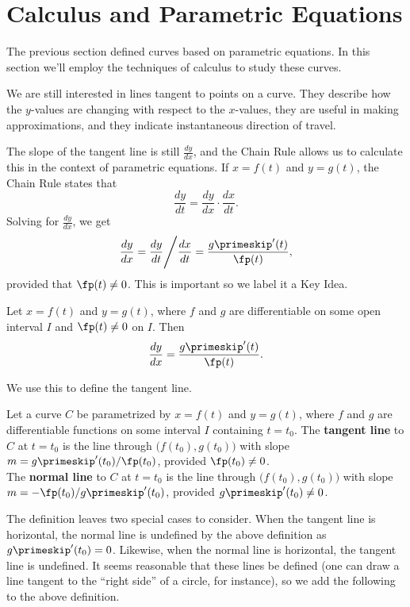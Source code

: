 \section{Calculus and Parametric Equations}\label{sec:par_calc}

The previous section defined curves based on parametric equations. In this section we'll employ the techniques of calculus to study these curves.

We are still interested in lines tangent to points on a curve. They describe how the $y$-values are changing with respect to the $x$-values, they are useful in making approximations, and they indicate instantaneous direction of travel.

The slope of the tangent line is still $\frac{dy}{dx}$, and the Chain Rule allows us to calculate this in the context of parametric equations. If $x=f(t)$ and $y=g(t)$, the Chain Rule states that $$\frac{dy}{dt} = \frac{dy}{dx}\cdot\frac{dx}{dt}.$$
Solving for $\frac{dy}{dx}$, we get 
$$\frac{dy}{dx} = \frac{dy}{dt}\Bigg/\frac{dx}{dt} = \frac{g\primeskip'(t)}{\fp(t)},$$
provided that $\fp(t)\neq 0$. This is important so we label it a Key Idea.

{Let $x=f(t)$ and $y=g(t)$, where $f$ and $g$ are differentiable on some open interval $I$ and $\fp(t)\neq 0$ on $I$. Then 
$$\frac{dy}{dx} = \frac{g\primeskip'(t)}{\fp(t)}.$$
}

We use this to define the tangent line.

{Let a curve $C$ be parametrized by $x=f(t)$ and $y=g(t)$, where $f$ and $g$ are differentiable functions on some interval $I$ containing $t=t_0$. The \textbf{tangent line} to $C$ at $t=t_0$ is the line through $\big(f(t_0),g(t_0)\big)$ with slope $m=g\primeskip'(t_0)/\fp(t_0)$, provided $\fp(t_0)\neq 0$.\\

The \textbf{normal line} to $C$ at $t=t_0$ is the line through $\big(f(t_0),g(t_0)\big)$ with slope $m=-\fp(t_0)/g\primeskip'(t_0)$, provided $g\primeskip'(t_0)\neq 0$.
}

The definition leaves two special cases to consider. When the tangent line is horizontal, the normal line is undefined by the above definition as $g\primeskip'(t_0)=0$. Likewise, when the normal line is horizontal, the tangent line is undefined. It seems reasonable that these lines be defined (one can draw a line tangent to the ``right side'' of a circle, for instance), so we add the following to the above definition.

